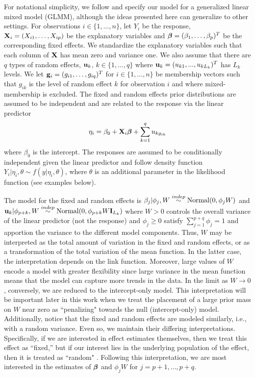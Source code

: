 \documentclass[12pt]{article}
\begin{document}
For notational simplicity, we follow \cite{simpson2017penalising} and specify our model for a generalized linear mixed model (GLMM), although the ideas presented here can generalize to other settings.  For observations $i\in\{1,\dots,n\}$, let $Y_i$ be the response, $\mbox{\bf X}_i = (X_{i1},\dots,X_{ip})$ %
be the explanatory variables and $\mbox{\boldmath $\beta$}= (\beta_1,\dots,\beta_p)^T$ be the corresponding fixed effects. We standardize the explanatory variables such that each column of $\mbox{\bf X}$ has mean zero and variance one.  We also assume that there are $q$ types of random effects, $\mbox{\bf u}_k$, $k\in\{1,\dots,q\}$ where $\mbox{\bf u}_k= (u_{k1},...,u_{kL_k})^T$ has $L_k$ levels. We let ${\bf g}_{i}=(g_{i1},\dots,g_{iq})^T$ for $i\in\{1,\dots,n\}$ be membership vectors such that $g_{ik}$ is the level of random effect $k$ for observation $i$ and where mixed-membership is excluded. The fixed and random effects prior distributions are assumed to be independent and are related to the response via the linear predictor
\begin{equation}\label{e:linear_predictor}
  \eta_i = \beta_0 + \mbox{\bf X}_i\mbox{\boldmath $\beta$} + \sum_{k=1}^q u_{kg_{ik}}
\end{equation}
where $\beta_0$ is the intercept. The responses are assumed to be conditionally independent given the linear predictor and follow density function $Y_i|\eta_i,\theta\sim f(y|\eta_i, \theta)$, where $\theta$ is an additional parameter in the likelihood function (see examples below).

The model for the fixed and random effects is $\beta_j|\phi_j,W\stackrel{indep}{\sim}\mbox{Normal}(0, \phi_j W)$ and $\mbox{\bf u}_k|\phi_{p+k},W\stackrel{indep}{\sim}\mbox{Normal}(0, \phi_{p+k}W \mbox{\bf I}_{L_k})$ where $W>0$ controls the overall variance of the linear predictor (not the response) and $\phi_j\ge0$ satisfy  $\sum_{j=1}^{p+q}\phi_{j}=1$ and apportion the variance to the different model components. Thus, $W$ may be interpreted as the total amount of variation in the fixed and random effects, or as a transformation of the total variation of the mean function. In the latter case, the interpretation depends on the link function. Moreover, large values of $W$ encode a model with greater flexibility since large variance in the mean function means that the model can capture more trends in the data. In the limit as $W\to0$, conversely, we are reduced to the intercept-only model. This interpretation will be important later in this work when we treat the placement of a large prior mass on $W$ near zero as ``penalizing" towards the null (intercept-only) model. Additionally, notice that the fixed and random effects are modeled similarly, i.e., with a random variance. Even so, we maintain their differing interpretations. Specifically, if we are interested in effect estimates themselves, then we treat this effect as ``fixed,'' but if our interest lies in the underlying population of the effect, then it is treated as ``random" \citep{searle2009variance}. Following this interpretation, we are most interested in the estimates of $\mbox{\boldmath $\beta$}$ and $\phi_j W$ for $j=p+1,\dots,p+q$.
\end{document}
